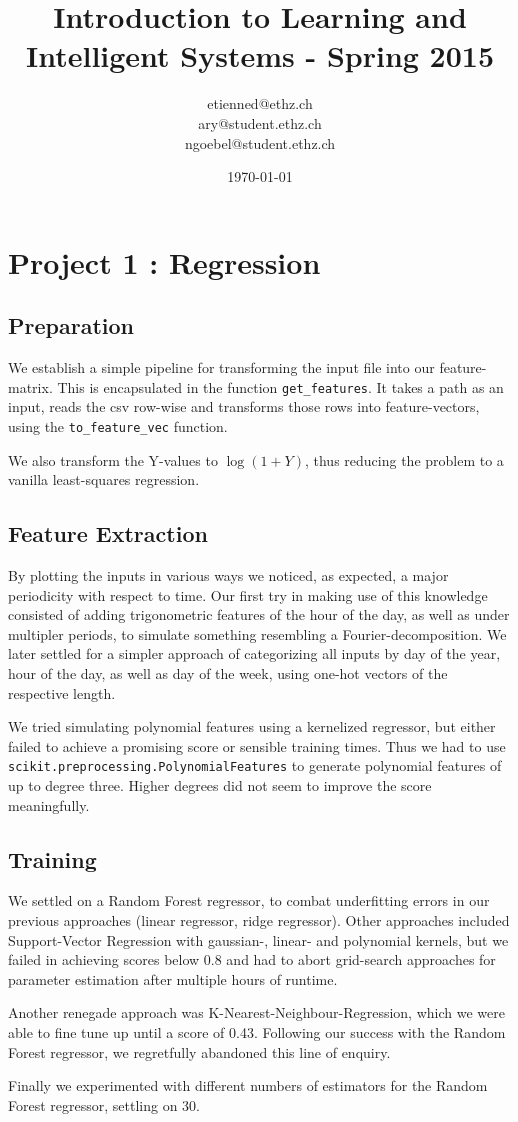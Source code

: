 \documentclass[a4paper, 11pt]{article}
\title{Introduction to Learning and Intelligent Systems - Spring 2015}
\author{etienned@ethz.ch\\ ary@student.ethz.ch\\ ngoebel@student.ethz.ch\\}
\date{\today}
\begin{document}
\maketitle

\section*{Project 1 : Regression}

\subsection*{Preparation}

We establish a simple pipeline for transforming the input file into our feature-matrix.
This is encapsulated in the function \texttt{get\_features}.
It takes a path as an input, reads the csv row-wise and
transforms those rows into feature-vectors, using the \texttt{to\_feature\_vec} function.

We also transform the Y-values to $\log(1 + Y)$, thus reducing the problem
to a vanilla least-squares regression.

\subsection*{Feature Extraction}

By plotting the inputs in various ways we noticed, as expected,
a major periodicity with respect to time. Our first try in making use
of this knowledge consisted of adding trigonometric features of the
hour of the day, as well as under multipler periods, to simulate something
resembling a Fourier-decomposition. We later settled for a simpler approach
of categorizing all inputs by day of the year, hour of the day, as well as day of the week,
using one-hot vectors of the respective length.

We tried simulating polynomial features using a kernelized regressor, but either
failed to achieve a promising score or sensible training times. Thus we
had to use \texttt{scikit.preprocessing.PolynomialFeatures} to generate polynomial
features of up to degree three. Higher degrees did not seem to improve the score meaningfully.


\subsection*{Training}

We settled on a Random Forest regressor, to combat underfitting errors in
our previous approaches (linear regressor, ridge regressor). Other approaches
included Support-Vector Regression with gaussian-, linear- and polynomial kernels,
but we failed in achieving scores below 0.8 and had to abort grid-search approaches
for parameter estimation after multiple hours of runtime.

Another renegade approach was K-Nearest-Neighbour-Regression, which we were able
to fine tune up until a score of 0.43. Following our success with the Random Forest regressor, we regretfully
abandoned this line of enquiry.

Finally we experimented with different numbers of estimators for the Random Forest regressor,
settling on 30.
\end{document}
